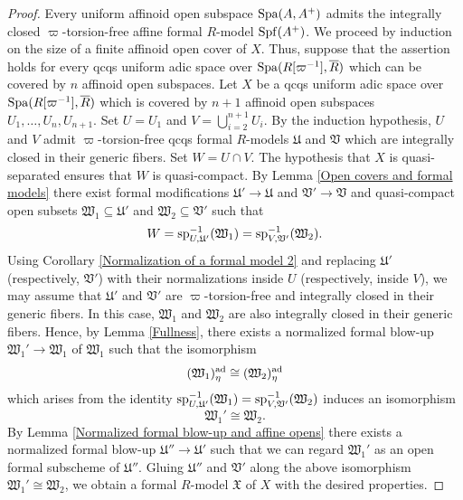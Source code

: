 \documentclass[12pt,twoside,a4paper]{article}
\theoremstyle{definition}
\theoremstyle{remark}
\newcommand\ad{{\rm ad}}
\newcommand\spc{{\rm sp}}
\newcommand\Spa{{\rm Spa}}
\newcommand\Spf{{\rm Spf}}
\begin{document}
\begin{proof}Every uniform affinoid open subspace $\Spa(A, A^{+})$ admits the integrally closed $\varpi$-torsion-free affine formal $R$-model $\Spf(A^{+})$. We proceed by induction on the size of a finite affinoid open cover of $X$. Thus, suppose that the assertion holds for every qcqs uniform adic space over $\Spa(R[\varpi^{-1}], \overline{R})$ which can be covered by $n$ affinoid open subspaces. Let $X$ be a qcqs uniform adic space over $\Spa(R[\varpi^{-1}], \overline{R})$ which is covered by $n+1$ affinoid open subspaces $U_{1},\dots, U_{n}, U_{n+1}$. Set $U=U_{1}$ and $V=\bigcup_{i=2}^{n+1}U_{i}$. By the induction hypothesis, $U$ and $V$ admit $\varpi$-torsion-free qcqs formal $R$-models $\mathfrak{U}$ and $\mathfrak{V}$ which are integrally closed in their generic fibers. Set $W=U\cap V$. The hypothesis that $X$ is quasi-separated ensures that $W$ is quasi-compact. By Lemma \ref{Open covers and formal models} there exist formal modifications $\mathfrak{U}'\to\mathfrak{U}$ and $\mathfrak{V}'\to\mathfrak{V}$ and quasi-compact open subsets $\mathfrak{W}_{1}\subseteq \mathfrak{U}'$ and $\mathfrak{W}_{2}\subseteq \mathfrak{V}'$ such that \begin{equation*}W=\spc_{U,\mathfrak{U}'}^{-1}(\mathfrak{W}_{1})=\spc_{V,\mathfrak{V}'}^{-1}(\mathfrak{W}_{2}).\end{equation*}Using Corollary \ref{Normalization of a formal model 2} and replacing $\mathfrak{U}'$ (respectively, $\mathfrak{V}'$) with their normalizations inside $U$ (respectively, inside $V$), we may assume that $\mathfrak{U}'$ and $\mathfrak{V}'$ are $\varpi$-torsion-free and integrally closed in their generic fibers. In this case, $\mathfrak{W}_{1}$ and $\mathfrak{W}_{2}$ are also integrally closed in their generic fibers. Hence, by Lemma \ref{Fullness}, there exists a normalized formal blow-up $\mathfrak{W}_{1}'\to\mathfrak{W}_{1}$ of $\mathfrak{W}_{1}$ such that the isomorphism \begin{equation*}(\mathfrak{W}_{1})_{\eta}^{\ad}\cong(\mathfrak{W}_{2})_{\eta}^{\ad}\end{equation*}which arises from the identity $\spc_{U,\mathfrak{U}'}^{-1}(\mathfrak{W}_{1})=\spc_{V,\mathfrak{V}'}^{-1}(\mathfrak{W}_{2})$ induces an isomorphism \begin{equation*}\mathfrak{W}_{1}'\cong\mathfrak{W}_{2}.\end{equation*}By Lemma \ref{Normalized formal blow-up and affine opens} there exists a normalized formal blow-up $\mathfrak{U}''\to\mathfrak{U}'$ such that we can regard $\mathfrak{W}_{1}'$ as an open formal subscheme of $\mathfrak{U}''$. Gluing $\mathfrak{U}''$ and $\mathfrak{V}'$ along the above isomorphism $\mathfrak{W}_{1}'\cong\mathfrak{W}_{2}$, we obtain a formal $R$-model $\mathfrak{X}$ of $X$ with the desired properties.\end{proof}
\end{document}
